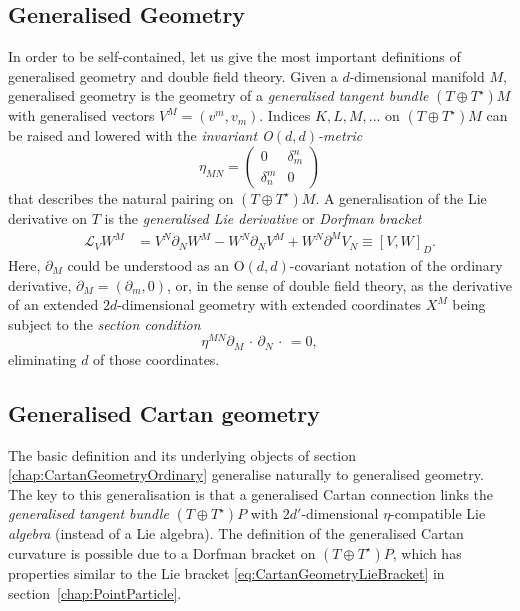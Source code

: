 \documentclass[11pt,a4paper]{article}
\numberwithin{equation}{section}
\newcommand{\commentO}[1]{ {\color{blue}  [{\bf O: #1}]}}
\begin{document}
\subsection{Generalised Geometry} \label{chap:GeneralisedGeometryDefintion}
In order to be self-contained, let us give the most important definitions of generalised geometry and double field theory. Given a $d$-dimensional manifold $M$, generalised geometry is the geometry of a \textit{generalised tangent bundle} $(T \oplus T^\star) M$ with generalised vectors $V^M = (v^m , v_m)$. Indices $K,L,M,...$ on $(T \oplus T^\star) M$ can be raised and lowered with the \textit{invariant O$(d,d)$-metric}
\begin{equation}
	\eta_{MN} = \left( \begin{array}{cc} 0 & \delta_m^n \\ \delta_n^m & 0	\end{array} \right) \label{eq:InvariantMetric}
\end{equation}
that describes the natural pairing on $(T\oplus T^\star)M$. A generalisation of the Lie derivative on $T$ is the \textit{generalised Lie derivative} or \textit{Dorfman bracket}
\begin{align}
	\mathcal{L}_{V} W^M &= V^N\partial_N W^M - W^N \partial_N V^M + W^N \partial^M V_N \equiv [V,W]_D \label{eq:GeneralisedLieDerivative}.
\end{align}
Here, $\partial_M$ could be understood as an O$(d,d)$-covariant notation of the ordinary derivative, $\partial_M = (\partial_m , 0)$, or, in the sense of double field theory, as the derivative of an extended $2d$-dimensional geometry with extended coordinates $X^M$ being subject to the \textit{section condition}
\begin{equation}
	\eta^{MN} \partial_M \, \cdot \, \partial_N \, \cdot \, = 0, \label{eq:SectionCondition}
\end{equation}
eliminating $d$ of those coordinates. 

\subsection{Generalised Cartan geometry} \label{chap:GeneralisedCartanGeometryDefintion}
The basic definition and its underlying objects of section \ref{chap:CartanGeometryOrdinary} generalise naturally to generalised geometry. The key to this generalisation is that a generalised Cartan connection links the \textit{generalised tangent bundle} $(T\oplus T^\star)P$ with $2d'$-dimensional $\eta$-compatible Lie \textit{algebra} (instead of a Lie algebra). The definition of the generalised Cartan curvature is possible due to a Dorfman bracket on $(T \oplus T^\star)P$, which has properties similar to the Lie bracket \eqref{eq:CartanGeometryLieBracket} in section~\ref{chap:PointParticle}. 
\end{document}
